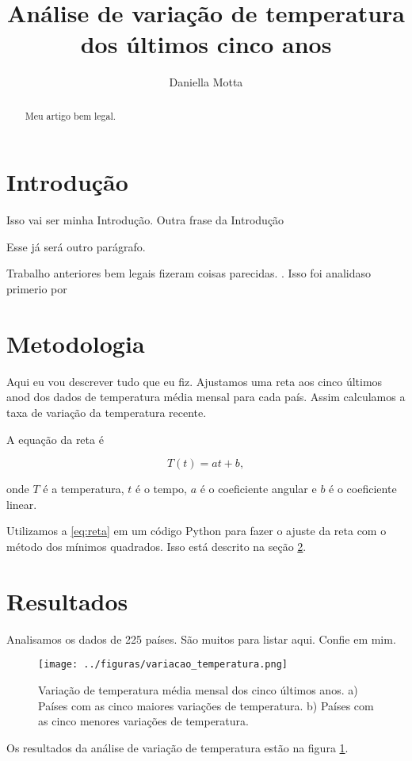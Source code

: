 \documentclass{article}
\begin{document}
\title{Análise de variação de temperatura dos últimos cinco anos}
\author{Daniella Motta}

\maketitle
\begin{abstract}
    Meu artigo bem legal.
\end{abstract}


\section{Introdução}
Isso vai ser minha Introdução.
Outra frase da Introdução

Esse já será outro parágrafo.

Trabalho anteriores bem legais fizeram coisas parecidas.
\citep{Hansen2010}.
Isso foi analidaso primerio por \citet{Hansen2010}

\section{Metodologia}
\label{sec:metodos}

Aqui eu vou descrever tudo que eu fiz.
Ajustamos uma reta aos cinco últimos anod dos dados
de temperatura média mensal para cada país.
Assim calculamos a taxa de variação da temperatura recente.

A equação da reta é

\begin{equation}
T(t) = a t + b,
\label{eq:reta}
\end{equation}

\noindent
onde  $T$ é a temperatura, $t$ é o tempo, $a$ é o coeficiente angular e $b$ é o coeficiente linear.

Utilizamos a \ref{eq:reta} em um código Python para fazer o ajuste da reta com o método dos mínimos quadrados.
Isso está descrito na seção \ref{sec:metodos}.

\section{Resultados}

Analisamos os dados de 225 países. São muitos para listar aqui. Confie em mim.

\begin{figure} [!tb]
    \centering
    \texttt{[image: ../figuras/variacao\_temperatura.png]}
    \caption{
        Variação de temperatura média mensal dos cinco últimos anos.
        a) Países com as cinco maiores variações de temperatura.
        b) Países com as cinco menores variações de temperatura.
    }
    \label{fig:variacao}

\end{figure}
Os resultados da análise de variação de temperatura estão na figura \ref{fig:variacao}.



\end{document}
